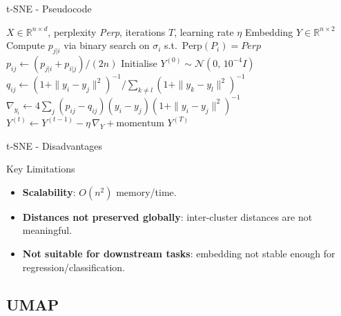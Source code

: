 \documentclass[aspectratio=169]{beamer}
\begin{document}
\begin{frame}{t-SNE - Pseudocode}
  \begin{algorithm}[H]
    \footnotesize
    \caption{t-SNE}
    \begin{algorithmic}[1]
      \Require $X \in \mathbb{R}^{n \times d}$, perplexity \textit{Perp}, iterations $T$, learning rate $\eta$
      \Ensure Embedding $Y \in \mathbb{R}^{n \times 2}$
      \State Compute $p_{j|i}$ via binary search on $\sigma_i$ s.t.\ $\mathrm{Perp}(P_i)=\textit{Perp}$
      \State $p_{ij} \leftarrow (p_{j|i}+p_{i|j})/(2n)$
      \State Initialise $Y^{(0)} \sim \mathcal{N}(0,\, 10^{-4} I)$
        \State $q_{ij} \leftarrow (1+\|y_i-y_j\|^2)^{-1} \big/ \textstyle\sum_{k\neq l}(1+\|y_k-y_l\|^2)^{-1}$
        \State $\nabla_{y_i} \leftarrow 4\sum_j (p_{ij}-q_{ij})(y_i-y_j)(1+\|y_i-y_j\|^2)^{-1}$
        \State $Y^{(t)} \leftarrow Y^{(t-1)} - \eta\,\nabla_Y + \text{momentum}$
      \EndFor
      \Return $Y^{(T)}$
    \end{algorithmic}
  \end{algorithm}
\end{frame}

\begin{frame}{t-SNE - Disadvantages}
    \begin{alertblock}{ Key Limitations}
    \begin{itemize}\small
        \item \textbf{Scalability}: $O(n^2)$ memory/time.
        \item \textbf{Distances not preserved globally}: inter-cluster distances are not meaningful.
        \item \textbf{Not suitable for downstream tasks}: embedding not stable enough for regression/classification.
    \end{itemize}
    \end{alertblock}
\end{frame}

\subsection{UMAP}
\end{document}
